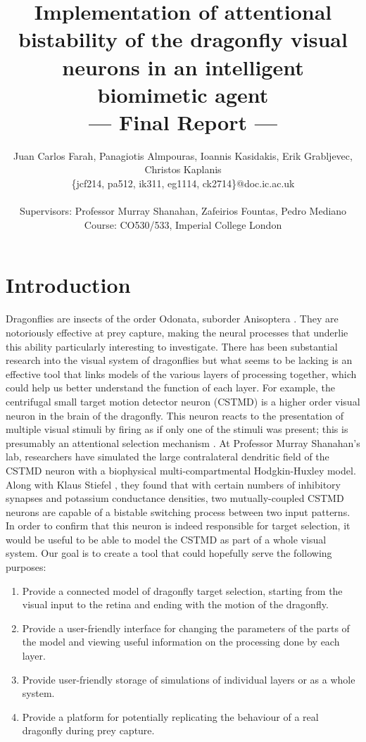 \documentclass[a4paper,11pt]{article}
\title{Implementation of attentional bistability of the dragonfly visual neurons in an intelligent biomimetic agent\\\Large{--- Final Report ---}}
\author{Juan Carlos Farah, Panagiotis Almpouras, Ioannis Kasidakis, Erik Grabljevec, Christos Kaplanis\\
       \{jcf214, pa512, ik311, eg1114, ck2714\}@doc.ic.ac.uk\\ \\
       \small{Supervisors: Professor Murray Shanahan, Zafeirios Fountas, Pedro Mediano}\\
       \small{Course: CO530/533, Imperial College London}
}
\begin{document}
\maketitle

\tableofcontents

\clearpage
\section{Introduction}

Dragonflies are insects of the order Odonata, suborder Anisoptera \cite{dfwiki}. They are notoriously effective at prey capture, making the neural processes that underlie this ability particularly interesting to investigate. There has been substantial research into the visual system of dragonflies but what seems to be lacking is an effective tool that links models of the various layers of processing together, which could help us better understand the function of each layer. For example, the centrifugal small target motion detector neuron (CSTMD) is a higher order visual neuron in the brain of the dragonfly. This neuron reacts to the presentation of multiple visual stimuli by firing as if only one of the stimuli was present; this is presumably an attentional selection mechanism \cite{w13}. At Professor Murray Shanahan's lab, researchers have simulated the large contralateral dendritic field of the CSTMD neuron with a biophysical multi-compartmental Hodgkin-Huxley model. Along with Klaus Stiefel \cite{ne13}, they found that with certain numbers of inhibitory synapses and potassium conductance densities, two mutually-coupled CSTMD neurons are capable of a bistable switching process between two input patterns. In order to confirm that this neuron is indeed responsible for target selection, it would be useful to be able to model the CSTMD as part of a whole visual system. Our goal is to create a tool that could hopefully serve the following purposes:
\begin{enumerate}
\item Provide a connected model of dragonfly target selection, starting from the visual input to the retina and ending with the motion of the dragonfly.
\item Provide a user-friendly interface for changing the parameters of the parts of the model and viewing useful information on the processing done by each layer.
\item Provide user-friendly storage of simulations of individual layers or as a whole system.
\item Provide a platform for potentially replicating the behaviour of a real dragonfly during prey capture.
\end{enumerate}
\end{document}
